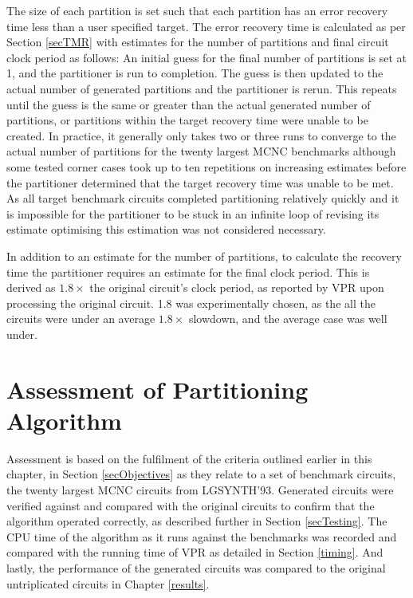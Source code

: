 \documentclass[12pt,final,oneside,a4paper]{dwThesis} %
\begin{document}
    The size of each partition is set such that each partition has an error recovery time less than a user specified target.
    The error recovery time is calculated as per Section \ref{secTMR} with estimates for the number of partitions and final circuit clock period as follows:
    An initial guess for the final number of partitions is set at 1, and the partitioner is run to completion.
    The guess is then updated to the actual number of generated partitions and the partitioner is rerun. This repeats until the guess is the same or greater than the actual generated number of partitions, or partitions within the target recovery time were unable to be created.
    In practice, it generally only takes two or three runs to converge to the actual number of partitions for the twenty largest \gls{MCNC} benchmarks although some tested corner cases took up to ten repetitions on increasing estimates before the partitioner determined that the target recovery time was unable to be met.
    As all target benchmark circuits completed partitioning relatively quickly and it is impossible for the partitioner to be stuck in an infinite loop of revising its estimate optimising this estimation was not considered necessary.
    
    In addition to an estimate for the number of partitions, to calculate the recovery time the partitioner requires an estimate for the final clock period. This is derived as $1.8\times$ the original circuit's clock period, as reported by \gls{VPR} upon processing the original circuit. 1.8 was experimentally chosen, as the all the circuits were under an average $1.8\times$ slowdown, and the average case was well under.
    
   \section{Assessment of
      Partitioning Algorithm} Assessment is based on the fulfilment of
   the criteria outlined earlier in this chapter, in Section
   \ref{secObjectives} as they relate to a set of benchmark circuits, the
   twenty largest MCNC circuits from LGSYNTH'93.  Generated circuits were
   verified against and compared with the original circuits to confirm
   that the algorithm operated correctly, as described further in Section
   \ref{secTesting}.  The \gls{CPU} time of
   the algorithm as it runs against the benchmarks was recorded and
   compared with the running time of \gls{VPR} as detailed in Section
   \ref{timing}. And lastly, the
   performance of the generated circuits was compared to the original
   untriplicated circuits in Chapter \ref{results}.
\end{document}
